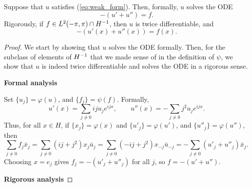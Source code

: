\documentclass{homework}
\begin{document}
\begin{arabicparts}
		\questionpart
		Suppose that $u$ satisfies (\ref{eq:weak_form}). Then, formally, $u$ solves the ODE
		\begin{equation}
			-(u' + u'')= f.
		\end{equation}
		Rigorously, if $f \in {L^2(-\pi,\pi)} \cap {H^{-1}}$, then $u$ is twice differentiable, and
		\begin{equation}
			-(u'(x) + u''(x)) = f(x).
		\end{equation}
		\begin{proof}
			We start by showing that $u$ solves the ODE formally. Then, for the subclass of elements of ${H^{-1}}$ that we made sense of in the definition of $\psi$, we show that $u$ is indeed twice differentiable and solves the ODE in a rigorous sense.
			
			\textbf{Formal analysis}
			
			Set $\{u_j\} = \varphi(u)$, and $\{f_j\} = \psi(f)$. Formally,
			\begin{equation}
				u'(x) = \sum_{j\ne0}iju_je^{ijx}, \qquad u''(x) = -\sum_{j\ne0}j^2u_je^{ijx}.
			\end{equation}
			Thus, for all $x\in H$, if $\{x_j\} = \varphi(x)$ and $\{u'_j\} = \varphi(u')$, and $\{u''_j\}=\varphi(u'')$, then
			\begin{equation}
				\label{eq:ode_manip}
				\sum_{j\ne0}f_j\bar{x}_j = \sum_{j\ne0}(ij + j^2)x_j\bar{u}_j = \sum_{j\ne 0}(-ij+j^2)x_{-j}\bar{u}_{-j} = -\sum_{j\ne0}(u'_j + u''_j)\bar{x}_j.
			\end{equation}
			Choosing $x = e_j$ gives $f_j = -(u'_j + u''_j)$ for all $j$, so $f = -(u' + u'')$.
			
			\textbf{Rigorous analysis}
			

\end{proof}
\end{arabicparts}
\end{document}
